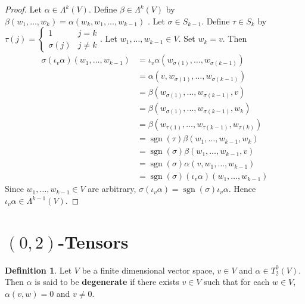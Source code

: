 \documentclass{book}
\theoremstyle{definition}
\newtheorem{defn}[definition]{Definition}
\newcommand{\al}{\alpha}
\newcommand{\be}{\beta}
\newcommand{\sig}{\sigma}
\newcommand{\Lam}{\Lambda}
\DeclareMathOperator{\sgn}{sgn}
\DeclareMathOperator*{\0}{\mbf{0}}
\DeclareMathOperator*{\1}{\mbf{1}}
\newcommand{\tbf}[1]{\textbf{#1}}
\begin{document}
	\begin{proof}
		Let $\al \in \Lam^k(V)$. Define $\be \in \Lam^{k}(V)$ by $\be(w_1, \ldots, w_k) = \al(w_k, w_1, \ldots, w_{k-1})$ . Let $\sig \in S_{k-1}$. Define $\tau \in S_k$ by 
		$\tau(j) = 
		\begin{cases}
			1       & j = k \\
			\sig(j) & j \neq k 
		\end{cases}$. 
		Let $w_1, \ldots, w_{k-1} \in V$. Set $w_k = v$. Then 
		\begin{align*}
			\sig (\iota_v \al) (w_1, \ldots, w_{k-1})
			& = \iota_v \al (w_{\sig(1)}, \ldots, w_{\sig(k-1)}) \\
			& = \al (v, w_{\sig(1)}, \ldots, w_{\sig(k-1)}) \\
			& = \be(w_{\sig(1)}, \ldots, w_{\sig(k-1)}, v) \\
			& = \be(w_{\sig(1)}, \ldots, w_{\sig(k-1)}, w_k) \\
			& = \be(w_{\tau(1)}, \ldots, w_{\tau(k-1)}, w_{\tau(k)}) \\
			& = \sgn (\tau) \be (w_1, \ldots, w_{k-1}, w_k) \\
			& = \sgn(\sig) \be (w_1, \ldots, w_{k-1}, v) \\
			& = \sgn(\sig) \al (v, w_1, \ldots, w_{k-1}) \\
			& = \sgn(\sig) (\iota_v \al) (w_1, \ldots, w_{k-1})
		\end{align*}
		Since $w_1, \ldots, w_{k-1} \in V$ are arbitrary, $\sig(\iota_v \al) = \sgn(\sig) \iota_v \al$. Hence $\iota_v \al \in \Lam^{k-1}(V)$.
	\end{proof}


























	
	\newpage
	\section{$(0,2)$-Tensors}
	\begin{defn}
		Let $V$ be a finite dimensional vector space, $v \in V$ and $\al \in T^0_2(V)$. Then $\al$ is said to be \tbf{degenerate} if  there exists $v \in V$ such that for each $w \in V$, $\al(v, w) = 0$ and $v \neq 0$. 
	\end{defn}
\end{document}
